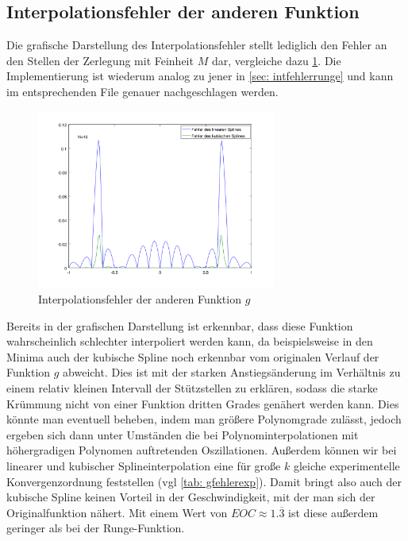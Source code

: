 \documentclass[a4paper, 11pt, ngerman]{scrartcl}
\begin{document}
\newpage
%
\subsection{Interpolationsfehler der anderen Funktion}
Die grafische Darstellung des Interpolationsfehler stellt lediglich den Fehler an den Stellen der Zerlegung mit Feinheit $M$ dar, vergleiche dazu \cref{fig: gfehlerplot}. Die Implementierung ist wiederum analog zu jener in \cref{sec: intfehlerrunge} und kann im entsprechenden File genauer nachgeschlagen werden.
%

\begin{figure}[htbp] 
	\centering
	\includegraphics[width=0.7\textwidth]{../gfehlerplot.png}
	\caption{Interpolationsfehler der anderen Funktion $g$}
	\label{fig: gfehlerplot}
\end{figure}

Bereits in der grafischen Darstellung ist erkennbar, dass diese Funktion wahrscheinlich schlechter interpoliert werden kann, da beispielsweise in den Minima auch der kubische Spline noch erkennbar vom originalen Verlauf der Funktion $g$ abweicht. Dies ist mit der starken Anstiegsänderung im Verhältnis zu einem relativ kleinen Intervall der Stützstellen zu erklären, sodass die starke Krümmung nicht von einer Funktion dritten Grades genähert werden kann. Dies könnte man eventuell beheben, indem man größere Polynomgrade zulässt, jedoch ergeben sich dann unter Umständen die bei Polynominterpolationen mit höhergradigen Polynomen auftretenden Oszillationen. Außerdem können wir bei linearer und kubischer Splineinterpolation eine für große $k$ gleiche experimentelle Konvergenzordnung feststellen (vgl \cref{tab: gfehlerexp}). Damit bringt also auch der kubische Spline keinen Vorteil in der Geschwindigkeit, mit der man sich der Originalfunktion nähert. Mit einem Wert von $EOC \approx 1.\overline{3}$ ist diese außerdem geringer als bei der Runge-Funktion.
\end{document}
